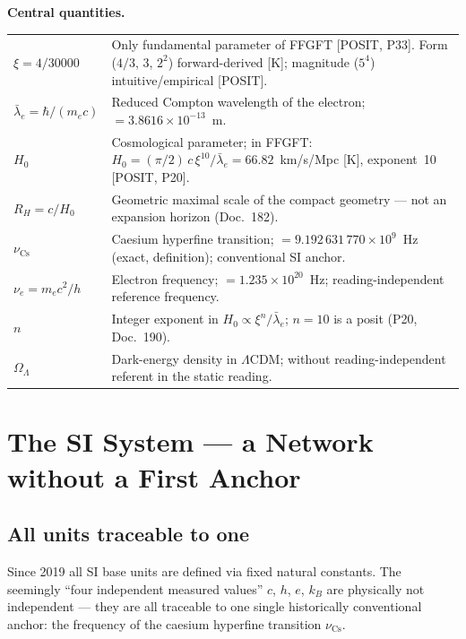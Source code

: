 \medskip
\noindent\textbf{Central quantities.}

\medskip
\begin{tabular}{@{}lp{10.5cm}}
$\xi = 4/30000$
  & Only fundamental parameter of FFGFT [POSIT, P33].
    Form ($4/3$, $3$, $2^2$) forward-derived [K];
    magnitude ($5^4$) intuitive/empirical [POSIT]. \\[4pt]
$\bar\lambda_e = \hbar/(m_e c)$
  & Reduced Compton wavelength of the electron;
    $= 3.8616\times10^{-13}$~m. \\[4pt]
$H_0$
  & Cosmological parameter; in FFGFT:
    $H_0 = (\pi/2)\,c\,\xi^{10}/\bar\lambda_e = 66.82$~km/s/Mpc
    [K], exponent~10 [POSIT, P20]. \\[4pt]
$R_H = c/H_0$
  & Geometric maximal scale of the compact geometry —
    not an expansion horizon (Doc.~182). \\[4pt]
$\nu_\text{Cs}$
  & Caesium hyperfine transition; $= 9.192\,631\,770\times10^9$~Hz
    (exact, definition); conventional SI anchor. \\[4pt]
$\nu_e = m_e c^2/h$
  & Electron frequency; $= 1.235\times10^{20}$~Hz;
    reading-independent reference frequency. \\[4pt]
$n$
  & Integer exponent in $H_0 \propto \xi^n/\bar\lambda_e$;
    $n = 10$ is a posit (P20, Doc.~190). \\[4pt]
$\Omega_\Lambda$
  & Dark-energy density in $\Lambda$CDM;
    without reading-independent referent in the static reading. \\
\end{tabular}

\chapter{The SI System — a Network without a First Anchor}

\section{All units traceable to one}

Since 2019 all SI base units are defined via fixed natural constants.
The seemingly ``four independent measured values'' $c$, $h$, $e$,
$k_B$ are physically not independent — they are all traceable to one
single historically conventional anchor: the frequency of the caesium
hyperfine transition $\nu_\text{Cs}$.

